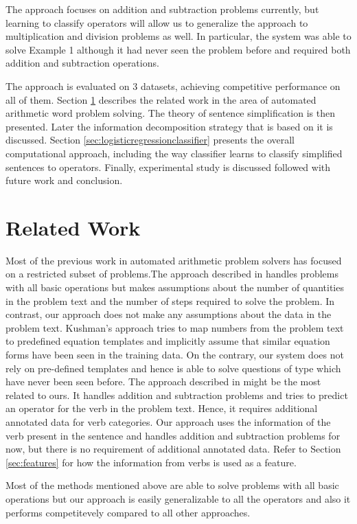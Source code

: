 \documentclass[11pt]{article}
\begin{document}
The approach focuses on addition and subtraction problems currently, but learning to classify operators will allow us to generalize the approach to multiplication and division problems as well. In particular, the system was able to solve Example 1 although it had never seen the problem before and required both addition and subtraction operations.

The approach is evaluated on 3 datasets, achieving competitive performance on all of them. Section \ref{sec:relatedwork} describes the related work in the area of automated arithmetic word problem solving. The theory of sentence simplification is then presented. Later the information decomposition strategy that is based on it is discussed. Section \ref{sec:logisticregressionclassifier} presents the overall computational approach, including the way classifier learns to classify simplified sentences to operators. Finally, experimental study is discussed followed with future work and conclusion.

\section{Related Work} \label{sec:relatedwork}
Most of the previous work in automated arithmetic problem solvers has focused on a restricted subset of problems.The approach described in \citep{RoyTACL15} handles problems with all basic operations but makes assumptions about the number of quantities in the problem text and the number of steps required to solve the problem. In contrast, our approach does not make any assumptions about the data in the problem text. Kushman's approach \citep{Kushman} tries to map numbers from the problem text to predefined equation templates and implicitly assume that similar equation forms have been seen in the training data. On the contrary, our system does not rely on pre-defined templates and hence is able to solve questions of type which have never been seen before.  The approach described in \citep{ARIS} might be the most related to ours. It handles addition and subtraction problems and tries to predict an operator for the verb in the problem text. Hence, it requires additional annotated data for verb categories. Our approach uses the information of the verb present in the sentence and handles addition and subtraction problems for now, but there is no requirement of additional annotated data. Refer to Section \ref{sec:features} for how the information from verbs is used as a feature. 

Most of the methods mentioned above are able to solve problems with all basic operations but our approach is easily generalizable to all the operators and also it performs competitevely compared to all other approaches. 
\end{document}
